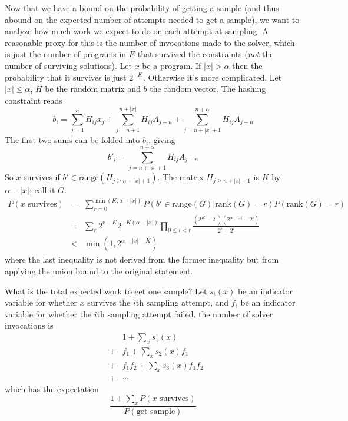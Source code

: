 \documentclass{article}
\begin{document}
Now that we have a bound on the probability of getting a sample (and thus abound on the expected number of attempts needed to get a sample),
we want to analyze how much work we expect to do on each attempt at sampling.
A reasonable proxy for this is the number of invocations made to the solver,
which is just the number of programs in $E$ that survived the constraints (\emph{not} the number of surviving solutions).
Let $x$ be a program.
If $|x|>\alpha$ then the probability that it survives is just $2^{-K}$.
Otherwise it's more complicated.
Let $|x|\leq \alpha$, $H$ be the random matrix and $b$ the random vector.
The hashing constraint reads
\begin{equation}
  b_i = \sum_{j = 1}^n H_{ij}x_j + \sum_{j = n+1}^{n+|x|}H_{ij}A_{j-n} + \sum_{j = n + |x| + 1}^{n + \alpha}H_{ij}A_{j-n}
\end{equation}
The first two sums can be folded into $b_i$, giving
\begin{equation}
  b'_i = \sum_{j = n + |x| + 1}^{n + \alpha}H_{ij}A_{j-n}
\end{equation}
So $x$ survives if $b'\in\text{range}(H_{j\geq n + |x| + 1})$.
The matrix $H_{j\geq n + |x| + 1}$ is $K$ by $\alpha - |x|$; call it $G$.
\begin{eqnarray}
  P(x \text{ survives})& = &\sum_{r = 0}^{\min(K,\alpha - |x|)}P(b'\in\text{range}(G) | \text{rank}(G) = r)P(\text{rank}(G) = r)\\
  & = &\sum_r 2^{r - K}2^{-K(\alpha - |x|)}\prod_{0\leq i<r}\frac{(2^K - 2^i)(2^{\alpha - |x|} - 2^i)}{2^r - 2^i}\\
  &<&\min (1,2^{\alpha - |x| - K})
\end{eqnarray}
where the last inequality is not derived from the former inequality but from applying the union bound to the original statement.

What is the total expected work to get one sample?
Let $s_i(x)$ be an indicator variable for whether $x$ survives the $i$th sampling attempt,
and $f_i$ be an indicator variable for whether the $i$th sampling attempt failed.
the number of solver invocations is
\begin{eqnarray*}
  &&1 + \sum_x s_1(x)\\
  &+&f_1 + \sum_xs_2(x)f_1\\
  &+&f_1f_2 + \sum_xs_3(x)f_1f_2\\
  &+&\cdots
\end{eqnarray*}
which has the expectation
\begin{equation}
  \frac{1 + \sum_x P(x \text{ survives})}{P(\text{get sample})}
\end{equation}
\end{document}
